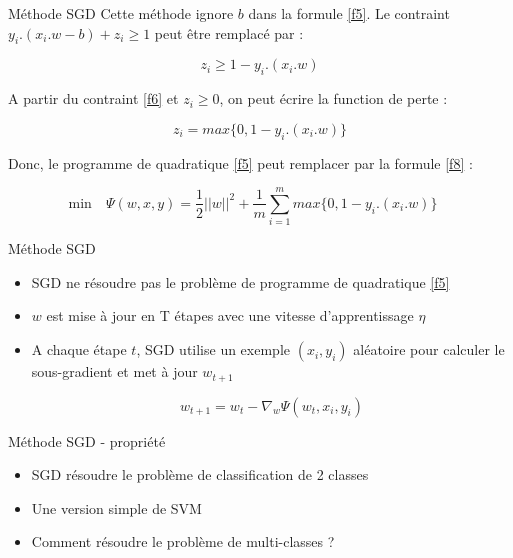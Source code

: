 \documentclass[11pt]{beamer}
\begin{document}
\begin{otherlanguage}{french}
\begin{frame}{Méthode SGD}
Cette méthode ignore $b$  dans la formule \ref{f5}. Le contraint $y_i.(x_i.w - b) + z_i \geq 1$ peut être remplacé par : 

\begin{equation}
z_i \geq 1 - y_i.(x_i.w)
\label{f6}
\end{equation}

A partir du contraint \ref{f6} et $z_i \geq 0$, on peut écrire la function de perte :

\begin{equation}
z_i = max\lbrace0, 1 - y_i.(x_i.w)\rbrace
\label{f7}
\end{equation}

Donc, le programme de quadratique \ref{f5} peut remplacer par la formule \ref{f8} :

\begin{equation}
\mbox{min}\quad \Psi(w, x, y) = \frac{1}{2} ||w||^2 + \frac{1}{m}\sum\limits_{i=1}^m max\lbrace0, 1 - y_i.(x_i.w)\rbrace\quad
\label{f8}
\end{equation}

\end{frame}


\begin{frame}{Méthode SGD}
\begin{itemize}
\item SGD ne résoudre pas le problème de programme de quadratique \ref{f5}
\item $w$ est mise à jour en T étapes avec une vitesse d'apprentissage $\eta$
\item A chaque étape $t$, SGD utilise un exemple $(x_i, y_i)$ aléatoire pour calculer le sous-gradient et met à jour $w_{t+1}$

\begin{equation}
w_{t+1} = w_t - \nabla_w{\Psi(w_t, x_i, y_i)}
\label{f9}
\end{equation}
\end{itemize}

\end{frame}

\begin{frame}{Méthode SGD - propriété}
\begin{itemize}
\item SGD résoudre le problème de classification de 2 classes
\item Une version simple de SVM
\item Comment résoudre le problème de multi-classes ?
\end{itemize}


\end{frame}
\end{otherlanguage}
\end{document}
